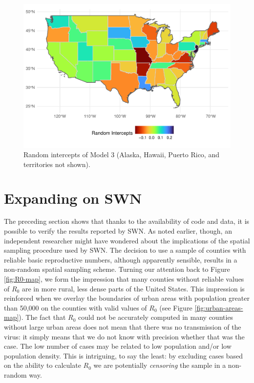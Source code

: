 \documentclass[10pt,letterpaper]{article}
\begin{document}
\begin{figure}
\includegraphics[width=1\linewidth]{R0-Density-Reanalysis_files/figure-latex/random-terms-map-1} \caption{\label{fig:random-terms-map}Random intercepts of Model 3 (Alaska, Hawaii, Puerto Rico, and territories not shown).}\label{fig:random-terms-map}
\end{figure}

\hypertarget{expanding-on-swn}{%
\section{Expanding on SWN}\label{expanding-on-swn}}

The preceding section shows that thanks to the availability of code and
data, it is possible to verify the results reported by SWN. As noted
earlier, though, an independent researcher might have wondered about the
implications of the spatial sampling procedure used by SWN. The decision
to use a sample of counties with reliable basic reproductive numbers,
although apparently sensible, results in a non-random spatial sampling
scheme. Turning our attention back to Figure \ref{fig:R0-map}, we form
the impression that many counties without reliable values of \(R_0\) are
in more rural, less dense parts of the United States. This impression is
reinforced when we overlay the boundaries of urban areas with population
greater than 50,000 on the counties with valid values of \(R_0\) (see
Figure \ref{fig:urban-areas-map}). The fact that \(R_0\) could not be
accurately computed in many counties without large urban areas does not
mean that there was no transmission of the virus: it simply means that
we do not know with precision whether that was the case. The low number
of cases may be related to low population and/or low population density.
This is intriguing, to say the least: by excluding cases based on the
ability to calculate \(R_0\) we are potentially \emph{censoring} the
sample in a non-random way.
\end{document}
